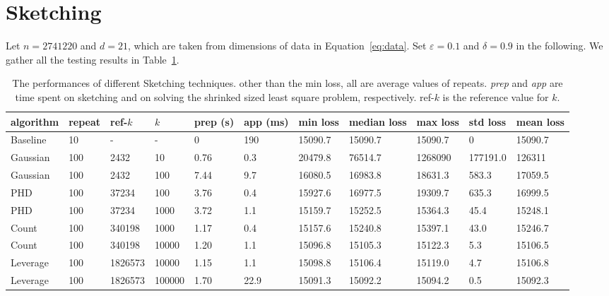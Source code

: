 \section{Sketching}

Let $n=2741220$ and $d=21$, which are taken
from dimensions of data in Equation~\eqref{eq:data}.
Set $\varepsilon=0.1$ and $\delta=0.9$ in the following.
We gather all the testing results in Table~\ref{tab:grand}.

\begin{table}[htb]
  \setlength{\tabcolsep}{2.6pt}
  \caption{The performances of different Sketching techniques.
    other than the min loss, all are average values of repeats.
    \emph{prep} and \emph{app} are time spent on sketching and
    on solving the shrinked sized least square problem, respectively.
    ref-$k$ is the reference value for $k$.}
  \label{tab:grand}
  \centering
  {\small
  \begin{tabular}{lllllllllll}
    \toprule
    algorithm & repeat & ref-$k$ & $k$ & prep (s) & app (ms) & min loss & median loss & max loss & std loss & mean loss \\
    \midrule
    Baseline & 10 & - & - & 0 & 190 & 15090.7 & 15090.7 & 15090.7 & 0 & 15090.7 \\
    Gaussian & 100 & 2432 & 10 & 0.76 & 0.3 & 20479.8 & 76514.7 & 1268090 & 177191.0 & 126311 \\
    Gaussian & 100 & 2432 & 100 & 7.44 & 9.7 & 16080.5 & 16983.8 & 18631.3 & 583.3 & 17059.5 \\
    PHD & 100 & 37234 & 100 & 3.76 & 0.4 & 15927.6 & 16977.5 & 19309.7 & 635.3 & 16999.5 \\
    PHD & 100 & 37234 & 1000 & 3.72 & 1.1 & 15159.7 & 15252.5 & 15364.3 & 45.4 & 15248.1 \\
    Count & 100 & 340198 & 1000 & 1.17 & 0.4 & 15157.6 & 15240.8 & 15397.1 & 43.0 & 15246.7 \\
    Count & 100 & 340198 & 10000 & 1.20 & 1.1 & 15096.8 & 15105.3 & 15122.3 & 5.3 & 15106.5 \\
    Leverage & 100 & 1826573 & 10000 & 1.15 & 1.1 & 15098.8 & 15106.4 & 15119.0 & 4.7 & 15106.8 \\
    Leverage & 100 & 1826573 & 100000 & 1.70 & 22.9 & 15091.3 & 15092.2 & 15094.2 & 0.5 & 15092.3 \\
    \bottomrule
  \end{tabular}
  }
\end{table}

%
